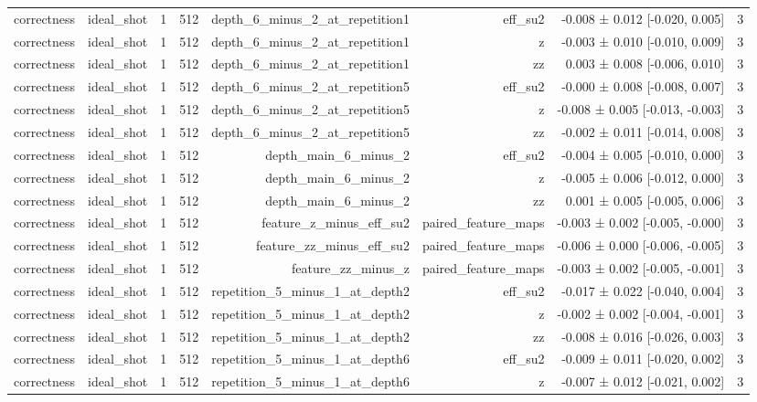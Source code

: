 \begin{table}
\begin{tabular}{lrrrrrrr}
correctness & ideal\_shot & 1 & 512 & depth\_6\_minus\_2\_at\_repetition1 & eff\_su2 & -0.008 ± 0.012 [-0.020, 0.005] & 3 \\
correctness & ideal\_shot & 1 & 512 & depth\_6\_minus\_2\_at\_repetition1 & z & -0.003 ± 0.010 [-0.010, 0.009] & 3 \\
correctness & ideal\_shot & 1 & 512 & depth\_6\_minus\_2\_at\_repetition1 & zz & 0.003 ± 0.008 [-0.006, 0.010] & 3 \\
correctness & ideal\_shot & 1 & 512 & depth\_6\_minus\_2\_at\_repetition5 & eff\_su2 & -0.000 ± 0.008 [-0.008, 0.007] & 3 \\
correctness & ideal\_shot & 1 & 512 & depth\_6\_minus\_2\_at\_repetition5 & z & -0.008 ± 0.005 [-0.013, -0.003] & 3 \\
correctness & ideal\_shot & 1 & 512 & depth\_6\_minus\_2\_at\_repetition5 & zz & -0.002 ± 0.011 [-0.014, 0.008] & 3 \\
correctness & ideal\_shot & 1 & 512 & depth\_main\_6\_minus\_2 & eff\_su2 & -0.004 ± 0.005 [-0.010, 0.000] & 3 \\
correctness & ideal\_shot & 1 & 512 & depth\_main\_6\_minus\_2 & z & -0.005 ± 0.006 [-0.012, 0.000] & 3 \\
correctness & ideal\_shot & 1 & 512 & depth\_main\_6\_minus\_2 & zz & 0.001 ± 0.005 [-0.005, 0.006] & 3 \\
correctness & ideal\_shot & 1 & 512 & feature\_z\_minus\_eff\_su2 & paired\_feature\_maps & -0.003 ± 0.002 [-0.005, -0.000] & 3 \\
correctness & ideal\_shot & 1 & 512 & feature\_zz\_minus\_eff\_su2 & paired\_feature\_maps & -0.006 ± 0.000 [-0.006, -0.005] & 3 \\
correctness & ideal\_shot & 1 & 512 & feature\_zz\_minus\_z & paired\_feature\_maps & -0.003 ± 0.002 [-0.005, -0.001] & 3 \\
correctness & ideal\_shot & 1 & 512 & repetition\_5\_minus\_1\_at\_depth2 & eff\_su2 & -0.017 ± 0.022 [-0.040, 0.004] & 3 \\
correctness & ideal\_shot & 1 & 512 & repetition\_5\_minus\_1\_at\_depth2 & z & -0.002 ± 0.002 [-0.004, -0.001] & 3 \\
correctness & ideal\_shot & 1 & 512 & repetition\_5\_minus\_1\_at\_depth2 & zz & -0.008 ± 0.016 [-0.026, 0.003] & 3 \\
correctness & ideal\_shot & 1 & 512 & repetition\_5\_minus\_1\_at\_depth6 & eff\_su2 & -0.009 ± 0.011 [-0.020, 0.002] & 3 \\
correctness & ideal\_shot & 1 & 512 & repetition\_5\_minus\_1\_at\_depth6 & z & -0.007 ± 0.012 [-0.021, 0.002] & 3 \\

\end{tabular}
\end{table}
